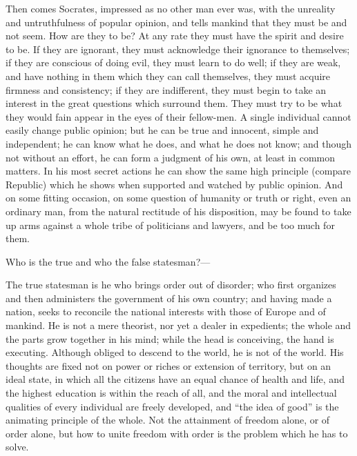 \documentclass[11pt,letter]{article}
\begin{document}
\par  Then comes Socrates, impressed as no other man ever was, with the unreality and untruthfulness of popular opinion, and tells mankind that they must be and not seem. How are they to be? At any rate they must have the spirit and desire to be. If they are ignorant, they must acknowledge their ignorance to themselves; if they are conscious of doing evil, they must learn to do well; if they are weak, and have nothing in them which they can call themselves, they must acquire firmness and consistency; if they are indifferent, they must begin to take an interest in the great questions which surround them. They must try to be what they would fain appear in the eyes of their fellow-men. A single individual cannot easily change public opinion; but he can be true and innocent, simple and independent; he can know what he does, and what he does not know; and though not without an effort, he can form a judgment of his own, at least in common matters. In his most secret actions he can show the same high principle (compare Republic) which he shows when supported and watched by public opinion. And on some fitting occasion, on some question of humanity or truth or right, even an ordinary man, from the natural rectitude of his disposition, may be found to take up arms against a whole tribe of politicians and lawyers, and be too much for them.

\par  Who is the true and who the false statesman?—

\par  The true statesman is he who brings order out of disorder; who first organizes and then administers the government of his own country; and having made a nation, seeks to reconcile the national interests with those of Europe and of mankind. He is not a mere theorist, nor yet a dealer in expedients; the whole and the parts grow together in his mind; while the head is conceiving, the hand is executing. Although obliged to descend to the world, he is not of the world. His thoughts are fixed not on power or riches or extension of territory, but on an ideal state, in which all the citizens have an equal chance of health and life, and the highest education is within the reach of all, and the moral and intellectual qualities of every individual are freely developed, and “the idea of good” is the animating principle of the whole. Not the attainment of freedom alone, or of order alone, but how to unite freedom with order is the problem which he has to solve.
\end{document}
